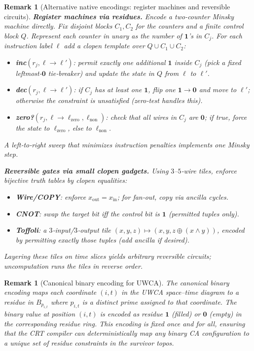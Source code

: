 \documentclass[12pt]{article}
\newtheorem{remark}[theorem]{Remark}
\numberwithin{equation}{section}
\begin{document}
\begin{remark}[Alternative native encodings: register machines and reversible circuits]\label{rem:alt-native}
\textbf{Register machines via residues.}
Encode a two-counter Minsky machine directly. Fix disjoint blocks $C_1,C_2$ for the counters and a finite control block $Q$. Represent each counter in unary as the number of $\mathbf{1}$'s in $C_j$. For each instruction label $\ell$ add a clopen template over $Q\cup C_1\cup C_2$:
\begin{itemize}[leftmargin=1.1em]
  \item \textbf{inc}$(r_j,\ell\!\to\!\ell')$: permit exactly one additional $\mathbf{1}$ inside $C_j$ (pick a fixed leftmost-$\mathbf{0}$ tie‑breaker) and update the state in $Q$ from $\ell$ to $\ell'$.
  \item \textbf{dec}$(r_j,\ell\!\to\!\ell')$: if $C_j$ has at least one $\mathbf{1}$, flip one $\mathbf{1}\!\to\!\mathbf{0}$ and move to $\ell'$; otherwise the constraint is unsatisfied (zero‑test handles this).
  \item \textbf{zero?}$(r_j,\ell\!\to\!\ell_{\mathrm{zero}},\ell_{\mathrm{non}})$: check that all wires in $C_j$ are $\mathbf{0}$; if true, force the state to $\ell_{\mathrm{zero}}$, else to $\ell_{\mathrm{non}}$.
\end{itemize}
A left‑to‑right sweep that minimizes instruction penalties implements one Minsky step.

\textbf{Reversible gates via small clopen gadgets.}
Using $3$–$5$‑wire tiles, enforce bijective truth tables by clopen equalities:
\begin{itemize}[leftmargin=1.1em]
  \item \textbf{Wire/COPY}: enforce $x_{\mathrm{out}}=x_{\mathrm{in}}$; for fan‑out, copy via ancilla cycles.
  \item \textbf{CNOT}: swap the target bit iff the control bit is $\mathbf{1}$ (permitted tuples only).
  \item \textbf{Toffoli}: a $3$‑input/$3$‑output tile $(x,y,z)\mapsto(x,y,z\oplus(x\wedge y))$, encoded by permitting exactly those tuples (add ancilla if desired).
\end{itemize}
Layering these tiles on time slices yields arbitrary reversible circuits; uncomputation runs the tiles in reverse order.
\end{remark}

\begin{remark}[Canonical binary encoding for UWCA]\label{rem:uwca-canonical}
The \emph{canonical binary encoding} maps each coordinate $(i,t)$ in the UWCA space--time diagram to a residue in $B_{p_{i,t}}$ where $p_{i,t}$ is a distinct prime assigned to that coordinate. The binary value at position $(i,t)$ is encoded as residue $\mathbf{1}$ (filled) or $\mathbf{0}$ (empty) in the corresponding residue ring. This encoding is fixed once and for all, ensuring that the CRT compiler can deterministically map any binary CA configuration to a unique set of residue constraints in the survivor topos.
\end{remark}
\end{document}
